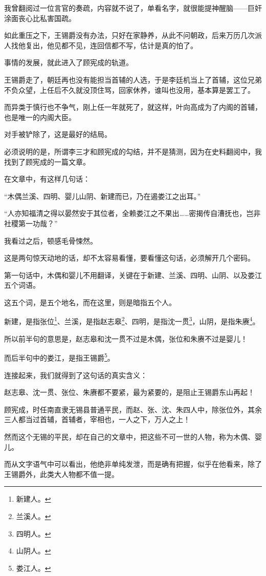 \begin{multicols}{\theparacolNo}
我曾翻阅过一位言官的奏疏，内容就不说了，单看名字，就很能提神醒脑——巨奸涂面丧心比私害国疏。

如此重压之下，王锡爵没有办法，只好在家静养，从此不问朝政，后来万历几次派人找他复出，他见都不见，连回信都不写，估计是真的怕了。

事情的发展，就此进入了顾宪成的轨道。

王锡爵走了，朝廷再也没有能担当首辅的人选，于是李廷机当上了首辅，这位兄弟不负众望，上任后不久就没顶住骂，回家休养，谁叫也没用，基本算是罢工了。

而异类于慎行也不争气，刚上任一年就死了，就这样，叶向高成为了内阁的首辅，也是唯一的内阁大臣。

对手被铲除了，这是最好的结局。

必须说明的是，所谓李三才和顾宪成的勾结，并不是猜测，因为在史料翻阅中，我找到了顾宪成的一篇文章。

在文章中，有这样几句话：

“木偶兰溪、四明、婴儿山阴、新建而已，乃在遏娄江之出耳。”

“人亦知福清之得以晏然安于其位者，全赖娄江之不果出……密揭传自漕抚也，岂非社稷第一功哉？”

我看过之后，顿感毛骨悚然。

这是两句惊天动地的话，却不太容易看懂，要看懂这句话，必须解开几个密码。

第一句话中，木偶和婴儿不用翻译，关键在于新建、兰溪、四明、山阴、以及娄江五个词语。

这五个词，是五个地名，而在这里，则是暗指五个人。

新建，是指张位\footnote{新建人。}、兰溪，是指赵志皋\footnote{兰溪人。}、四明，是指沈一贯\footnote{四明人。}，山阴，是指朱赓\footnote{山阴人。}。

所以前半句的意思是，赵志皋和沈一贯不过是木偶，张位和朱赓不过是婴儿！

而后半句中的娄江，是指王锡爵\footnote{娄江人。}。

连接起来，我们就得到了这句话的真实含义：

赵志皋、沈一贯、张位、朱赓都不要紧，最为紧要的，是阻止王锡爵东山再起！

顾宪成，时任南直隶无锡县普通平民，而赵、张、沈、朱四人中，除张位外，其余三人都当过首辅，首辅者，宰相也，一人之下，万人之上！

然而这个无锡的平民，却在自己的文章中，把这些不可一世的人物，称为木偶、婴儿。

而从文字语气中可以看出，他绝非单纯发泄，而是确有把握，似乎在他看来，除了王锡爵外，此类大人物都不值一提。


\end{multicols}
